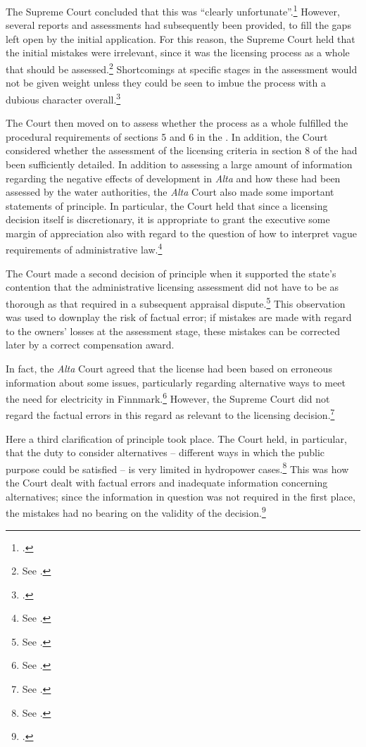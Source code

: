 The Supreme Court concluded that this was ``clearly unfortunate''.\footcite[265]{alta82} However, several reports and assessments had subsequently been provided, to fill the gaps left open by the initial application. For this reason, the Supreme Court held that the initial mistakes were irrelevant, since it was the licensing process as a whole that should be assessed.\footnote{See \cite[265-266]{alta82}.} Shortcomings at specific stages in the assessment would not be given weight unless they could be seen to imbue the process with a dubious character overall.\footcite[265]{alta82}

The Court then moved on to assess whether the process as a whole fulfilled the procedural requirements of sections 5 and 6 in the \cite{wra17}. In addition, the Court considered whether the assessment of the licensing criteria in section 8 of the \cite{wra17} had been sufficiently detailed. In addition to assessing a large amount of information regarding the negative effects of development in {\it Alta} and how these had been assessed by the water authorities, the {\it Alta} Court also made some important statements of principle. In particular, the Court held that since a licensing decision itself is discretionary, it is appropriate to grant the executive some margin of appreciation also with regard to the question of how to interpret vague requirements of administrative law.\footnote{See \cite[262-264]{alta82}.}

The Court made a second decision of principle when it supported the state's contention that the administrative licensing assessment did not have to be as thorough as that required in a subsequent appraisal dispute.\footnote{See \cite[279|330]{alta82}.} This observation was used to downplay the risk of factual error; if mistakes are made with regard to the owners' losses at the assessment stage, these mistakes can be corrected later by a correct compensation award.

In fact, the {\it Alta} Court agreed that the license had been based on erroneous information about some issues, particularly regarding alternative ways to meet the need for electricity in Finnmark.\footnote{See \cite[346-357]{alta82}.} However, the Supreme Court did not regard the factual errors in this regard as relevant to the licensing decision.\footnote{See \cite[346]{alta82}.} 

Here a third clarification of principle took place. The Court held, in particular, that the duty to consider alternatives -- different ways in which the public purpose could be satisfied -- is very limited in hydropower cases.\footnote{See \cite[346]{alta82}.} This was how the Court dealt with  factual errors and inadequate information concerning alternatives; since the information in question was not required in the first place, the mistakes had no bearing on the validity of the decision.\footcite[346]{alta82}

